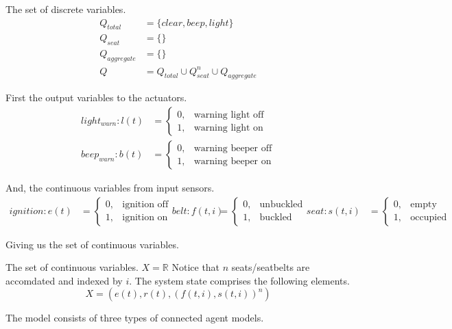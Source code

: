 \documentclass{article}
\begin{document}
The set of discrete variables.
\begin{align}
Q_{total} & = \{clear, beep, light \} \\
Q_{seat} & = \{ \} \\
Q_{aggregate} & = \{ \} \\
Q & = Q_{total} \cup Q_{seat}^n \cup Q_{aggregate}
\end{align}

First the output variables to the actuators.
\begin{align}
light_{warn} : l(t) & =
   \begin{cases}
      0, & \text{warning light off} \\
      1, & \text{warning light on}
    \end{cases} \\
 beep_{warn} : b(t) & =
   \begin{cases}
      0, & \text{warning beeper off} \\
      1, & \text{warning beeper on}
    \end{cases}
\end{align}

And, the continuous variables from input sensors.
\begin{align}
 ignition : e(t) & =
   \begin{cases}
      0, & \text{ignition off} \\
      1, & \text{ignition on}
    \end{cases}
  belt : f(t,i) & =
   \begin{cases}
      0, & \text{unbuckled} \\
      1, & \text{buckled}
    \end{cases}
  seat : s(t,i) & =
   \begin{cases}
      0, & \text{empty} \\
      1, & \text{occupied}
    \end{cases}
\end{align}

Giving us the set of continuous variables.

The set of continuous variables.
$X = \mathbb{R}$
Notice that $n$ seats/seatbelts are accomdated and indexed by $i$.
The system state comprises the following elements.
\begin{equation}
 X = (e(t), r(t), (f(t,i), s(t,i))^n)
\end{equation}


The model consists of three types of connected agent models.
\end{document}
